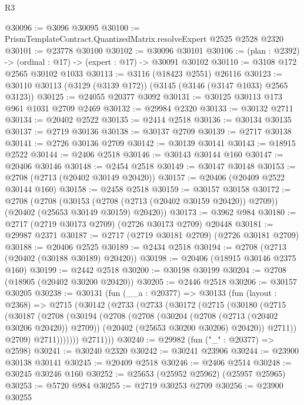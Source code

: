 \begin{lexlean}{R3}
\begin{coremodule}
@30096 := @3096 @30095
@30100 := PrismTemplateContract.QuantizedMatrix.resolveExpert @2525 @2528 @2320
@30101 := @23778 @30100
@30102 := @30096 @30101
@30106 := (plan : @2392) -> (ordinal : @17) -> (expert : @17) -> @30091 @30102
@30110 := @3108 @172 @2565 @30102 @1033
@30113 := @3116 (@18423 @2551) @26116
@30123 := @30110 @30113 (@3129 (@3139 @172)) (@3145 (@3146 (@3147 @1033) @2565 @3123))
@30125 := @24055 @20377 @3092
@30131 := @30125 @30113 @173 @961 @1031 @2709 @2469
@30132 := @29984 @2320
@30133 := @30132 @2711
@30134 := @20402 @2522
@30135 := @2414 @2518
@30136 := @30134 @30135
@30137 := @2719 @30136
@30138 := @30137 @2709
@30139 := @2717 @30138
@30141 := @2726 @30136 @2709
@30142 := @30139 @30141
@30143 := @18915 @2522
@30144 := @2406 @2518
@30146 := @30143 @30144 @160
@30147 := @20406 @30146
@30148 := @2454 @2518
@30149 := @30147 @30148
@30153 := @2708 (@2713 (@20402 @30149 @20420))
@30157 := @20406 (@20409 @2522 @30144 @160)
@30158 := @2458 @2518
@30159 := @30157 @30158
@30172 := @2708
    (@2708
      (@30153 (@2708 (@2713 (@20402 @30159 @20420)) @2709))
      (@20402 (@25653 @30149 @30159) @20420))
@30173 := @3962 @984
@30180 := @2717 (@2719 @30173 @2709) (@2726 @30173 @2709) @20448
@30181 := @29987 @2371
@30187 := @2717 (@2719 @30181 @2709) (@2726 @30181 @2709)
@30188 := @20406 @2525
@30189 := @2434 @2518
@30194 := @2708 (@2713 (@20402 (@30188 @30189) @20420))
@30198 := @20406 (@18915 @30146 @2375 @160)
@30199 := @2442 @2518
@30200 := @30198 @30199
@30204 := @2708 (@18905 (@20402 @30200 @20420))
@30205 := @2446 @2518
@30206 := @30157 @30205
@30238 := @30131
    (fun (__a : @20377) =>
    @30133
      (fun (layout : @2368) =>
      @2715
        (@30142
          (@2733
            (@2733
              (@30172
                (@2715
                  (@30180
                    (@2715
                      (@30187
                        (@2708
                          (@30194
                            (@2708
                              (@2708
                                (@30204 (@2708 (@2713 (@20402 @30206 @20420)) @2709))
                                (@20402 (@25653 @30200 @30206) @20420))
                              @2711))
                          @2709)
                        @2711)))))))
          @2711)))
@30240 := @29982 (fun ("_" : @20377) => @2598)
@30241 := @30240 @2320
@30242 := @30241 @23906
@30244 := @23900 @30138 @30141
@30245 := @20409 @2518
@30246 := @2406 @2514
@30248 := @30245 @30246 @160
@30252 := @25653 (@25952 @25962) (@25957 @25965)
@30253 := @5720 @984
@30255 := @2719 @30253 @2709
@30256 := @23900 @30255

\end{coremodule}
\end{lexlean}
